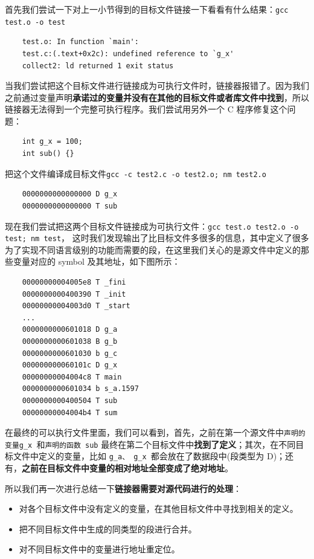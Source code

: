 \documentclass[UTF8,a4paper,12pt]{ctexbook}
\begin{document}
				首先我们尝试一下对上一小节得到的目标文件链接一下看看有什么结果：\verb|gcc test.o -o test|
				\begin{lstlisting}
	test.o: In function `main':
	test.c:(.text+0x2c): undefined reference to `g_x'
	collect2: ld returned 1 exit status
				\end{lstlisting}
			
				当我们尝试把这个目标文件进行链接成为可执行文件时，链接器报错了。因为我们之前通过变量声明\textbf{承诺过的变量并没有在其他的目标文件或者库文件中找到}，所以链接器无法得到一个完整可执行程序。我们尝试用另外一个 C 程序修复这个问题：
				\begin{lstlisting}
	int g_x = 100;
	int sub() {}
				\end{lstlisting}
				
				把这个文件编译成目标文件\verb|gcc -c test2.c -o test2.o; nm test2.o|
				\begin{lstlisting}
	0000000000000000 D g_x
	0000000000000000 T sub
				\end{lstlisting}
				
				现在我们尝试把这两个目标文件链接成为可执行文件：\verb|gcc test.o test2.o -o test; nm test|， 这时我们发现输出了比目标文件多很多的信息，其中定义了很多为了实现不同语言级别的功能而需要的段，在这里我们关心的是源文件中定义的那些变量对应的 symbol 及其地址，如下图所示：
				\begin{lstlisting}
	00000000004005e8 T _fini
	0000000000400390 T _init
	00000000004003d0 T _start
	...
	0000000000601018 D g_a
	0000000000601038 B g_b
	0000000000601030 b g_c
	000000000060101c D g_x
	00000000004004c8 T main
	0000000000601034 b s_a.1597
	0000000000400504 T sub
	00000000004004b4 T sum
				\end{lstlisting}
				
				在最终的可以执行文件里面，我们可以看到，首先，之前在第一个源文件中\verb|声明的变量g_x |和\verb|声明的函数 sub| 最终在第二个目标文件中\textbf{找到了定义}；其次，在不同目标文件中定义的变量，比如 \verb|g_a、 g_x |都会放在了数据段中(段类型为 D)；还有，\textbf{之前在目标文件中变量的相对地址全部变成了绝对地址}。
				
				所以我们再一次进行总结一下\textbf{链接器需要对源代码进行的处理}：
				\begin{itemize}[itemindent = 1em]
					\item 对各个目标文件中没有定义的变量，在其他目标文件中寻找到相关的定义。
					\item 把不同目标文件中生成的同类型的段进行合并。
					\item 对不同目标文件中的变量进行地址重定位。
				\end{itemize}
				
\end{document}
